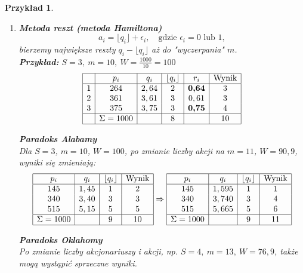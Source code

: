 \documentclass[12pt,a4paper]{article}
\theoremstyle{break}
\newtheorem{example}{Przykład}[section]
\begin{document}
	\begin{example}
		\begin{enumerate}[1)]
			\item \textbf{Metoda reszt (metoda Hamiltona)}\\
			\[
			a_i=\lfloor q_i \rfloor + \epsilon_i, \quad \text{gdzie } \epsilon_i = 0 \text{ lub } 1,
			\]
			bierzemy największe reszty $q_i - \lfloor q_i \rfloor$ aż do "wyczerpania" $m$.\\
			
			\textbf{Przykład:} $S=3,\: m=10,\: W=\frac{1000}{10}=100$\\
			\[
			\begin{array}{|c|c|c|c|c|c|}
				\hline
				& p_i & q_i & \lfloor q_i \rfloor & r_i & \text{Wynik} \\\hline
				1 & 264 & 2,64 & 2 & \textbf{0,64} & 3 \\
				2 & 361 & 3,61 & 3 & 0,61 & 3 \\
				3 & 375 & 3,75 & 3 & \textbf{0,75} & 4 \\\hline
				& \Sigma=1000 & & 8 & & 10 \\\hline
			\end{array}
			\]
			
			\textbf{Paradoks Alabamy}\\
			Dla $S=3$, $m=10$, $W=100$, po zmianie liczby akcji na $m=11$, $W=90,9$, wyniki się zmieniają:
			\[
			\begin{array}{|c|c|c|c|}
				\hline
				p_i & q_i & \lfloor q_i \rfloor & \text{Wynik} \\\hline
				145 & 1,45 & 1 & 2 \\
				340 & 3,40 & 3 & 3 \\
				515 & 5,15 & 5 & 5 \\\hline
				\Sigma=1000 & & 9 & 10 \\\hline
			\end{array}\Rightarrow\begin{array}{|c|c|c|c|}
			\hline
			p_i & q_i & \lfloor q_i \rfloor & \text{Wynik} \\\hline
			145 & 1,595 & 1 & 1 \\
			340 & 3,740 & 3 & 4 \\
			515 & 5,665 & 5 & 6 \\\hline
			\Sigma=1000 & & 9 & 11 \\\hline
		\end{array}
			\]
			
			\textbf{Paradoks Oklahomy}\\
			Po zmianie liczby akcjonariuszy i akcji, np. $S=4,\: m=13, \: W=76,9$, także mogą wystąpić sprzeczne wyniki.
			

\end{enumerate}
\end{example}
\end{document}
